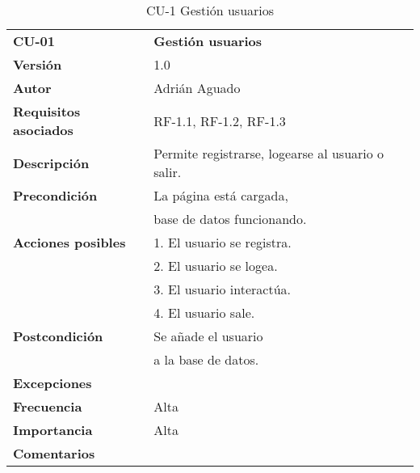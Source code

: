 \begin{table}[H]
\begin{tabular}{llr}  
\toprule
\begin{minipage}[b]{0.24\columnwidth}\raggedright\strut
\textbf{CU-01}\strut
\end{minipage} & \begin{minipage}[b]{0.72\columnwidth}\raggedright\strut
\textbf{Gestión usuarios}\strut
\end{minipage}\tabularnewline
\cmidrule(r){1-2}
\textbf{Versión}       & 1.0           \\
\textbf{Autor}       & Adrián  Aguado    \\
\textbf{Requisitos asociados}       & RF-1.1, RF-1.2, RF-1.3 \\ 
\textbf{Descripción} & Permite registrarse, logearse al usuario o salir.\\
\textbf{Precondición} & La página está cargada, \\
& base de datos funcionando.       \\
\textbf{Acciones posibles} & 1. El usuario se registra. \\
& 2. El usuario  se logea. \\
& 3. El usuario interactúa.\\
& 4. El usuario sale.        \\
\textbf{Postcondición} & Se añade el usuario \\
& a la base de datos.     \\
\textbf{Excepciones} &  \\
\textbf{Frecuencia} & Alta            \\
\textbf{Importancia} & Alta            \\
\textbf{Comentarios } &       \\
\bottomrule
\end{tabular}
\caption{CU-1 Gestión usuarios} 
\end{table}

